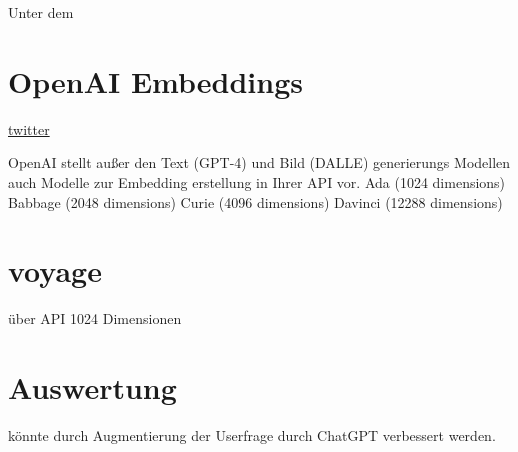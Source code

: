 Unter dem 


\section{OpenAI Embeddings}

\href{https://twitter.com/Nils_Reimers/status/1487014195568775173}{twitter}

OpenAI stellt außer den Text (GPT-4) und Bild (DALLE) generierungs Modellen auch Modelle zur Embedding erstellung in Ihrer API vor.
Ada (1024 dimensions)
Babbage (2048 dimensions)
Curie (4096 dimensions)
Davinci (12288 dimensions)

\section{voyage}

über API
1024 Dimensionen


\section{Auswertung}



könnte durch Augmentierung der Userfrage durch ChatGPT verbessert werden.\cite{shum2024}\cite{dai2023}